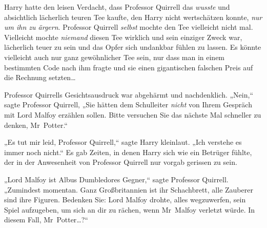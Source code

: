 Harry hatte den leisen Verdacht, dass Professor Quirrell das \emph{wusste} und absichtlich lächerlich teuren Tee kaufte, den Harry nicht wertschätzen konnte, \emph{nur um ihn zu ärgern}. Professor Quirrell \emph{selbst} mochte den Tee vielleicht nicht mal. Vielleicht mochte \emph{niemand} diesen Tee wirklich und sein einziger Zweck war, lächerlich teuer zu sein und das Opfer sich undankbar fühlen zu lassen. Es könnte vielleicht auch nur ganz gewöhnlicher Tee sein, nur dass man in einem bestimmten Code nach ihm fragte und sie einen gigantischen falschen Preis auf die Rechnung setzten…

Professor Quirrells Gesichtsausdruck war abgehärmt und nachdenklich. „Nein,“ sagte Professor Quirrell, „Sie hätten dem Schulleiter \emph{nicht} von Ihrem Gespräch mit Lord Malfoy erzählen sollen. Bitte versuchen Sie das nächste Mal schneller zu denken, Mr~Potter.“

„Es tut mir leid, Professor Quirrell,“ sagte Harry kleinlaut. „Ich verstehe es immer noch nicht.“ Es gab Zeiten, in denen Harry sich wie ein Betrüger fühlte, der in der Anwesenheit von Professor Quirrell nur vorgab gerissen zu sein.

„Lord Malfoy ist Albus Dumbledores Gegner,“ sagte Professor Quirrell. „Zumindest momentan. Ganz Großbritannien ist ihr Schachbrett, alle Zauberer sind ihre Figuren. Bedenken Sie: Lord Malfoy drohte, alles wegzuwerfen, sein Spiel aufzugeben, um sich an dir zu rächen, wenn Mr~Malfoy verletzt würde. In diesem Fall, Mr~Potter…?“

